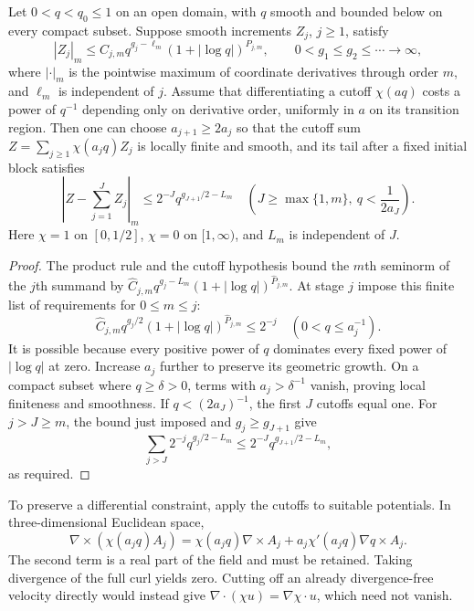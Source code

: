 \begin{lemma}
\label{lem:ns-diagonal-realization}
Let $0<q<q_0\leq1$ on an open domain, with $q$ smooth and bounded below
on every compact subset. Suppose smooth increments $Z_j$, $j\geq1$,
satisfy
\[
 |Z_j|_m\leq C_{j,m}q^{g_j-\ell_m}(1+|\log q|)^{P_{j,m}},
 \qquad 0<g_1\leq g_2\leq\cdots\longrightarrow\infty,
\]
where $|\cdot|_m$ is the pointwise maximum of coordinate derivatives through order
$m$, and $\ell_m$ is independent of $j$. Assume that differentiating a
cutoff $\chi(aq)$ costs a power of $q^{-1}$ depending only on derivative
order, uniformly in $a$ on its transition region. Then one can choose
$a_{j+1}\geq2a_j$ so that the cutoff sum
$Z=\sum_{j\geq1}\chi(a_jq)Z_j$ is locally finite and smooth, and its
tail after a fixed initial block satisfies
\[
 \left|Z-\sum_{j=1}^JZ_j\right|_m
 \leq2^{-J}q^{g_{J+1}/2-L_m}
 \quad\left(J\geq\max\{1,m\},\ q<\frac1{2a_J}\right).
\]
Here $\chi=1$ on $[0,1/2]$, $\chi=0$ on $[1,\infty)$, and $L_m$ is
independent of $J$.
\end{lemma}
\begin{proof}
The product rule and the cutoff hypothesis bound the $m$th seminorm of
the $j$th summand by
$\widehat C_{j,m}q^{g_j-L_m}(1+|\log q|)^{\widehat P_{j,m}}$.
At stage $j$ impose this finite list of requirements for $0\leq m\leq j$:
\[
 \widehat C_{j,m}q^{g_j/2}(1+|\log q|)^{\widehat P_{j,m}}
 \leq2^{-j}\quad(0<q\leq a_j^{-1}).
\]
It is possible because every positive power of $q$ dominates every fixed
power of $|\log q|$ at zero. Increase $a_j$ further to preserve its geometric
growth. On a compact subset where $q\geq\delta>0$, terms with
$a_j>\delta^{-1}$ vanish, proving local finiteness and smoothness.
If $q<(2a_J)^{-1}$, the first $J$ cutoffs equal one. For $j>J\geq m$,
the bound just imposed and $g_j\geq g_{J+1}$ give
\[
 \sum_{j>J}2^{-j}q^{g_j/2-L_m}
 \leq2^{-J}q^{g_{J+1}/2-L_m},
\]
as required.
\end{proof}

To preserve a differential constraint, apply the cutoffs to suitable
potentials. In three-dimensional Euclidean space,
\[
 \nabla\times(\chi(a_jq)A_j)
 =\chi(a_jq)\nabla\times A_j
   +a_j\chi'(a_jq)\nabla q\times A_j.
\]
The second term is a real part of the field and must be retained. Taking
divergence of the full curl yields zero. Cutting off an already
divergence-free velocity directly would instead give
$\nabla\cdot(\chi u)=\nabla\chi\cdot u$, which need not vanish.

